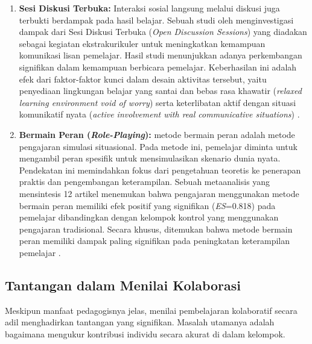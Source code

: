 \begin{enumerate}
    \item \textbf{Sesi Diskusi Terbuka:} Interaksi sosial langsung melalui diskusi juga terbukti berdampak pada hasil
    belajar. Sebuah studi oleh \textcite{DaifAllah2016} menginvestigasi dampak dari
    Sesi Diskusi Terbuka (\textit{Open Discussion Sessions}) yang diadakan sebagai
    kegiatan ekstrakurikuler untuk meningkatkan kemampuan komunikasi lisan pemelajar.
    Hasil studi menunjukkan adanya perkembangan signifikan dalam kemampuan berbicara
    pemelajar. Keberhasilan ini adalah efek dari faktor-faktor kunci dalam desain aktivitas tersebut, yaitu penyediaan lingkungan
    belajar yang santai dan bebas rasa khawatir (\textit{relaxed learning environment
    void of worry}) serta keterlibatan aktif dengan situasi komunikatif nyata
    (\textit{active involvement with real communicative situations})
    \autocite{DaifAllah2016}.

    \item \textbf{Bermain Peran (\textit{Role-Playing}):} metode bermain peran adalah metode pengajaran simulasi situasional. Pada
    metode ini, pemelajar diminta untuk mengambil peran spesifik untuk mensimulasikan
    skenario dunia nyata. Pendekatan ini memindahkan fokus dari
    pengetahuan teoretis ke penerapan praktis dan pengembangan keterampilan.
    Sebuah metaanalisis yang mensintesis 12 artikel menemukan
    bahwa pengajaran menggunakan metode bermain peran memiliki efek positif yang
    signifikan (\textit{ES}=0.818) pada pemelajar dibandingkan dengan kelompok kontrol
    yang menggunakan pengajaran tradisional. Secara khusus,
    ditemukan bahwa metode bermain peran memiliki dampak paling signifikan pada
    peningkatan keterampilan pemelajar \autocite{Fu2025}.
\end{enumerate}

\subsection{Tantangan dalam Menilai Kolaborasi}
\label{ssec:tantangan_menilai_kolaborasi}
Meskipun manfaat pedagogisnya jelas, menilai pembelajaran kolaboratif secara
adil menghadirkan tantangan yang signifikan. Masalah utamanya adalah bagaimana
mengukur kontribusi individu secara akurat di dalam kelompok.


